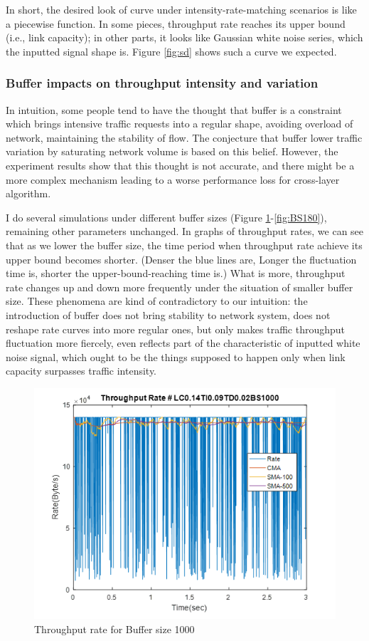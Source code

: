 \documentclass[a4paper]{article}
\begin{document}
In short, the desired look of curve under intensity-rate-matching scenarios is like a piecewise function. In some pieces, throughput rate reaches its upper bound (i.e., link capacity);  in other parts, it looks like Gaussian white noise series, which the inputted signal shape is. Figure \ref{fig:sd} shows such a curve we expected.

\subsubsection{Buffer impacts on throughput intensity and variation}
In intuition, some people tend to have the thought that buffer is a constraint which brings intensive traffic requests into a regular shape, avoiding overload of network, maintaining the stability of flow. The conjecture that buffer lower traffic variation by saturating network volume is based on this belief. However, the experiment results show that this thought is not accurate, and there might be a more complex mechanism leading to a worse performance loss for cross-layer algorithm.
	
I do several simulations under different buffer sizes (Figure \ref{fig:BS1000}-\ref{fig:BS180}), remaining other parameters unchanged. In graphs of throughput rates, we can see that as we lower the buffer size, the time period when throughput rate achieve its upper bound becomes shorter. (Denser the blue lines are, Longer the fluctuation time is, shorter the upper-bound-reaching time is.) What is more, throughput rate changes up and down more frequently under the situation of smaller buffer size. These phenomena are kind of contradictory to our intuition: the introduction of buffer does not bring stability to network system, does not reshape rate curves into more regular ones, but only makes traffic throughput fluctuation more fiercely, even reflects part of the characteristic of inputted white noise signal, which ought to be the things supposed to happen only when link capacity surpasses traffic intensity.

\begin{figure}
\centering
\includegraphics[width=1\textwidth]{BS1000.png}
\caption{\label{fig:BS1000}Throughput rate for Buffer size 1000 }
\end{figure}
\end{document}
